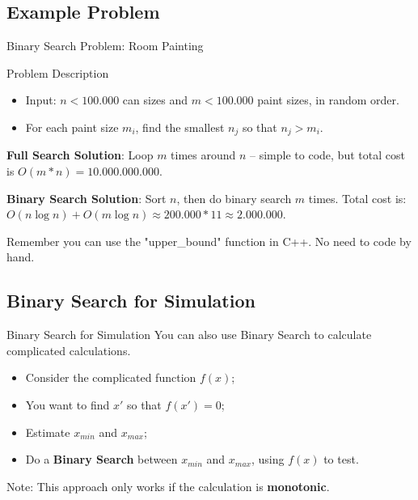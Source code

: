 \subsection{Example Problem}
\begin{frame}{Binary Search Problem: Room Painting}
  \begin{block}{Problem Description}
    \begin{itemize}
      \item Input: $n < 100.000$ can sizes and $m < 100.000$ paint sizes, in random order.
      \item For each paint size $m_i$, find the smallest $n_j$ so that $n_j > m_i$.
    \end{itemize}
  \end{block}

  {\bf Full Search Solution}: Loop $m$ times around $n$ -- simple to code, but total cost is $O(m*n) = 10.000.000.000$.\bigskip

  {\bf Binary Search Solution}: Sort $n$, then do binary search $m$ times. Total cost is:\\
  $O(n\log n) + O(m\log n) \approx 200.000 * 11 \approx 2.000.000$.\bigskip

  Remember you can use the "upper\_bound" function in C++. No need to code by hand.


\end{frame}

\subsection{Binary Search for Simulation}

\begin{frame}{Binary Search for Simulation}
  You can also use Binary Search to calculate complicated calculations.\bigskip

  \begin{itemize}
    \item Consider the complicated function $f(x)$;
    \item You want to find $x'$ so that $f(x') = 0$;
    \item Estimate $x_{min}$ and $x_{max}$;
    \item Do a {\bf Binary Search} between $x_{min}$ and $x_{max}$, using $f(x)$ to test.
  \end{itemize}\bigskip


  \begin{block}{}
    Note: This approach only works if the calculation is {\bf monotonic}.
  \end{block}
\end{frame}


